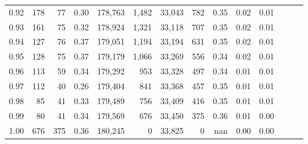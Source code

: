 \begin{tabular}{rrrrrrrrrrrrrr}
0.92 &    178 &   77 &  0.30 &  178,763 &    1,482 &  33,043 &     782 &  0.35 &  0.02 &      0.01 \\
0.93 &    161 &   75 &  0.32 &  178,924 &    1,321 &  33,118 &     707 &  0.35 &  0.02 &      0.01 \\
0.94 &    127 &   76 &  0.37 &  179,051 &    1,194 &  33,194 &     631 &  0.35 &  0.02 &      0.01 \\
0.95 &    128 &   75 &  0.37 &  179,179 &    1,066 &  33,269 &     556 &  0.34 &  0.02 &      0.01 \\
0.96 &    113 &   59 &  0.34 &  179,292 &      953 &  33,328 &     497 &  0.34 &  0.01 &      0.01 \\
0.97 &    112 &   40 &  0.26 &  179,404 &      841 &  33,368 &     457 &  0.35 &  0.01 &      0.01 \\
0.98 &     85 &   41 &  0.33 &  179,489 &      756 &  33,409 &     416 &  0.35 &  0.01 &      0.01 \\
0.99 &     80 &   41 &  0.34 &  179,569 &      676 &  33,450 &     375 &  0.36 &  0.01 &      0.00 \\
1.00 &    676 &  375 &  0.36 &  180,245 &        0 &  33,825 &       0 &   nan &  0.00 &      0.00 \\
\bottomrule
\end{tabular}
